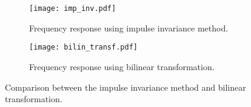 \begin{figure}[H]
\centering
\begin{subfigure}[b]{0.47\textwidth}		
        \texttt{[image: imp\_inv.pdf]}
        \vspace{2mm}
        \caption{Frequency response using impulse invariance method\citep{oppenheim}.}
        \label{fig:impulse_invariance}
    \end{subfigure} 
    \hspace{4mm} 
\begin{subfigure}[b]{0.48\textwidth}
        \texttt{[image: bilin\_transf.pdf]}
        \vspace{2mm}
        \caption{Frequency response using bilinear transformation\citep{oppenheim}.}
        \label{fig:bilinear_transform}
    \end{subfigure}  
\caption{Comparison between the impulse invariance method and bilinear transformation.}
\label{fig:filter_design_methods}
\end{figure}

